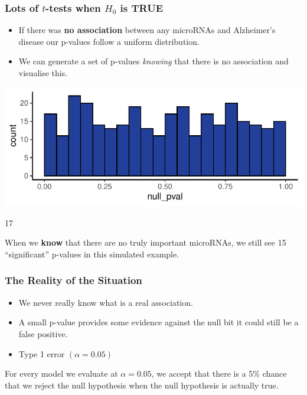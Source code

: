 \documentclass[a4paper]{article}
\begin{document}
\subsubsection{Lots of \( t \)-tests when \( H_0 \) is TRUE}
\begin{itemize}
	\item If there was \textbf{no association} between any microRNAs and Alzheimer's disease our p-values follow a uniform distribution.
	\item We can generate a set of p-values \textit{knowing} that there is no association and visualise this.
\end{itemize}
\begin{Schunk}


{\centering \includegraphics[width=\maxwidth]{figure/listings-unnamed-chunk-206-1} 

}

\begin{Soutput}
[1] 17
\end{Soutput}
\end{Schunk}
When we \textbf{know} that there are no truly important microRNAs, we still see 15 ``significant'' p-values in this simulated example.
\subsubsection{The Reality of the Situation}
\begin{itemize}
	\item We never really know what is a real association.
	\item A small p-value provides some evidence against the null bit it could still be a false positive.
	\item Type 1 error \( (\alpha = 0.05) \) 
\end{itemize}
\begin{goldbox}
	For every model we evaluate at \( \alpha = 0.05 \), we accept that there is a 5\% chance that we \textcolor{myred}{reject the null hypothesis} when \textcolor{mygreen}{the null hypothesis is actually true}.
\end{goldbox}
\end{document}
